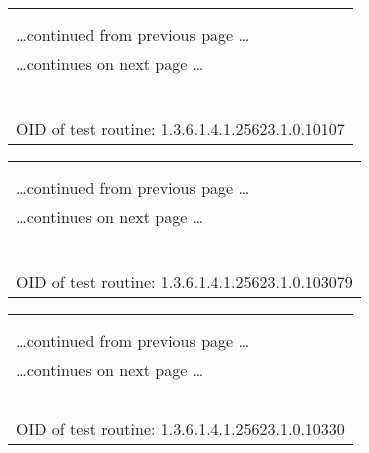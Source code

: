 \documentclass{article}
\begin{document}
\begin{longtable}{|p{}|}
\hline
\rowcolor{openvas_log}{\color{white}{Log (CVSS: 0.0) }}\\
\rowcolor{openvas_log}{\color{white}{NVT: HTTP Server type and version}}\\
\hline
\endfirsthead
\hfill\ldots continued from previous page \ldots \\
\hline
\endhead
\hline
\ldots continues on next page \ldots \\
\endfoot
\hline
\endlastfoot
\\
\rowcolor{white}{\verb=The remote web server type is :=}\\
\rowcolor{white}{\verb=lighttpd/1.4.26 =}\\
\rowcolor{white}{\verb==}\\
\rowcolor{white}{\verb==}\\
\\
OID of test routine: 1.3.6.1.4.1.25623.1.0.10107\\
\end{longtable}

\begin{longtable}{|p{}|}
\hline
\rowcolor{openvas_log}{\color{white}{Log (CVSS: 0.0) }}\\
\rowcolor{openvas_log}{\color{white}{NVT: DIRB (NASL wrapper)}}\\
\hline
\endfirsthead
\hfill\ldots continued from previous page \ldots \\
\hline
\endhead
\hline
\ldots continues on next page \ldots \\
\endfoot
\hline
\endlastfoot
\\
\rowcolor{white}{\verb=This are the directories/files found with brute force:=}\\
\rowcolor{white}{\verb=http://192.168.248.129:80/=}\\
\rowcolor{white}{\verb==}\\
\rowcolor{white}{\verb==}\\
\\
OID of test routine: 1.3.6.1.4.1.25623.1.0.103079\\
\end{longtable}

\begin{longtable}{|p{}|}
\hline
\rowcolor{openvas_log}{\color{white}{Log (CVSS: 0.0) }}\\
\rowcolor{openvas_log}{\color{white}{NVT: Services}}\\
\hline
\endfirsthead
\hfill\ldots continued from previous page \ldots \\
\hline
\endhead
\hline
\ldots continues on next page \ldots \\
\endfoot
\hline
\endlastfoot
\\
\rowcolor{white}{\verb=A web server is running on this port=}\\
\rowcolor{white}{\verb==}\\
\rowcolor{white}{\verb==}\\
\\
OID of test routine: 1.3.6.1.4.1.25623.1.0.10330\\
\end{longtable}
\end{document}
